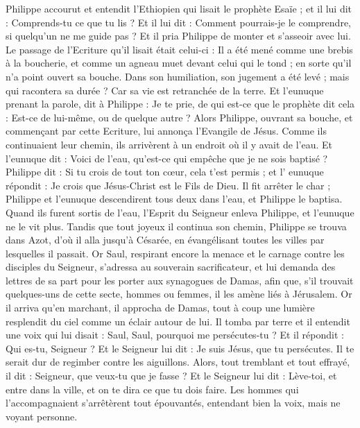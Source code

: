 \begin{multicols}{2}
Philippe accourut et entendit l'Ethiopien qui lisait le prophète Esaïe ; et il lui dit : Comprends-tu ce que tu lis ?
Et il lui dit : Comment pourrais-je le comprendre, si quelqu'un ne me guide pas ? Et il pria Philippe de monter et s'asseoir avec lui.
Le passage de l'Ecriture qu'il lisait était celui-ci : Il a été mené comme une brebis à la boucherie, et comme un agneau muet devant celui qui le tond ; en sorte qu'il n'a point ouvert sa bouche.
Dans son humiliation, son jugement a été levé ; mais qui racontera sa durée ? Car sa vie est retranchée de la terre.
Et l'eunuque prenant la parole, dit à Philippe : Je te prie, de qui est-ce que le prophète dit cela : Est-ce de lui-même, ou de quelque autre ?
Alors Philippe, ouvrant sa bouche, et commençant par cette Ecriture, lui annonça l'Evangile de Jésus.
Comme ils continuaient leur chemin, ils arrivèrent à un endroit où il y avait de l'eau. Et l'eunuque dit : Voici de l'eau, qu'est-ce qui empêche que je ne sois baptisé ?
Philippe dit : Si tu crois de tout ton cœur, cela t'est permis ; et l' eunuque répondit : Je crois que Jésus-Christ est le Fils de Dieu.
Il fit arrêter le char ; Philippe et l'eunuque descendirent tous deux dans l'eau, et Philippe le baptisa.
Quand ils furent sortis de l'eau, l'Esprit du Seigneur enleva Philippe, et l'eunuque ne le vit plus. Tandis que tout joyeux il continua son chemin,
Philippe se trouva dans Azot, d'où il alla jusqu'à Césarée, en évangélisant toutes les villes par lesquelles il passait.
\VerseOne{}Or Saul, respirant encore la menace et le carnage contre les disciples du Seigneur, s'adressa au souverain sacrificateur,
et lui demanda des lettres de sa part pour les porter aux synagogues de Damas, afin que, s'il trouvait quelques-uns de cette secte, hommes ou femmes, il les amène liés à Jérusalem.
Or il arriva qu'en marchant, il approcha de Damas, tout à coup une lumière resplendit du ciel comme un éclair autour de lui.
Il tomba par terre et il entendit une voix qui lui disait : Saul, Saul, pourquoi me persécutes-tu ?
Et il répondit : Qui es-tu, Seigneur ? Et le Seigneur lui dit : Je suis Jésus, que tu persécutes. Il te serait dur de regimber contre les aiguillons.
Alors, tout tremblant et tout effrayé, il dit : Seigneur, que veux-tu que je fasse ? Et le Seigneur lui dit : Lève-toi, et entre dans la ville, et on te dira ce que tu dois faire.
Les hommes qui l'accompagnaient s'arrêtèrent tout épouvantés, entendant bien la voix, mais ne voyant personne.

\end{multicols}
